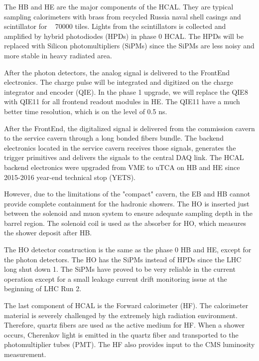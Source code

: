 The HB and HE are the major components of the HCAL. They are typical sampling calorimeters with brass from recycled Russia naval shell casings and scintillator for ~ 70000 tiles. Lights from the scintillators is collected and amplified by hybrid photodiodes (HPDs) in phase 0 HCAL. The HPDs will be replaced with Silicon photomultipliers (SiPMs) since the SiPMs are less noisy and more stable in heavy radiated area. 

After the photon detectors, the analog signal is delivered to the FrontEnd electronics. The charge pulse will be integrated and digitized on the charge integrator and encoder (QIE). In the phase 1 upgrade, we will replace the QIE8 with QIE11 for all frontend readout modules in HE. The QIE11 have a much better time resolution, which is on the level of 0.5 ns. 

After the FrontEnd, the digitalized signal is delivered from the commission cavern to the service cavern through a long bonded fibers bundle. The backend electronics located in the service cavern receives those signals, generates the trigger primitives and delivers the signals to the central DAQ link. The HCAL backend electronics were upgraded from VME to uTCA on HB and HE since 2015-2016 year-end technical stop (YETS)\cite{CMS:2012tda}. 

However, due to the limitations of the "compact" cavern, the EB and HB cannot provide complete containment for the hadronic showers. The HO is inserted just between the solenoid and muon system to ensure adequate sampling depth in the barrel region. The solenoid coil is used as the absorber for HO, which measures the shower deposit after HB. 

The HO detector construction is the same as the phase 0 HB and HE, except for the photon detectors. The HO has the SiPMs instead of HPDs since the LHC long shut down 1. The SiPMs have proved to be very reliable in the current operation except for a small leakage current drift monitoring issue at the beginning of LHC Run 2. 

The last component of HCAL is the Forward calorimeter (HF). The calorimeter material is severely challenged by the extremely high radiation environment. Therefore, quartz fibers are used as the active medium for HF. When a shower occurs, Cherenkov light is emitted in the quartz fiber and transported to the photomultiplier tubes (PMT). The HF also provides input to the CMS luminosity measurement. 

